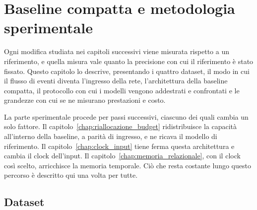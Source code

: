 \chapter{Baseline compatta e metodologia sperimentale}
\label{chap:baseline_metodologia}


Ogni modifica studiata nei capitoli successivi viene misurata rispetto a un riferimento, e quella misura vale quanto la precisione con cui il riferimento è stato fissato. Questo capitolo lo descrive, presentando i quattro dataset, il modo in cui il flusso di eventi diventa l'ingresso della rete, l'architettura della baseline compatta, il protocollo con cui i modelli vengono addestrati e confrontati e le grandezze con cui se ne misurano prestazioni e costo.

La parte sperimentale procede per passi successivi, ciascuno dei quali cambia un solo fattore. Il capitolo~\ref{chap:riallocazione_budget} ridistribuisce la capacità all'interno della baseline, a parità di ingresso, e ne ricava il modello di riferimento. Il capitolo~\ref{chap:clock_input} tiene ferma questa architettura e cambia il clock dell'input. Il capitolo~\ref{chap:memoria_relazionale}, con il clock così scelto, arricchisce la memoria temporale. Ciò che resta costante lungo questo percorso è descritto qui una volta per tutte.



\section{Dataset}
\label{sec:dataset}

